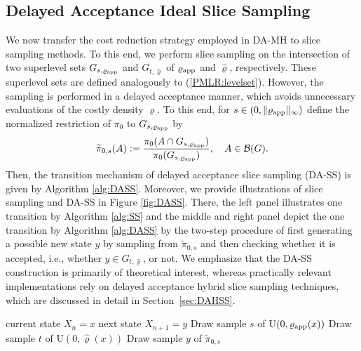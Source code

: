 \documentclass[sn-mathphys-num]{sn-jnl}%
\theoremstyle{thmstyleone}%
\theoremstyle{thmstyletwo}%
\theoremstyle{thmstylethree}%
\newcommand{\rhoapp}{\varrho_{{\rm app}}}
\newcommand{\change}[1]{\bgroup\color{black}#1\egroup}    %
\begin{document}
\subsection{Delayed Acceptance Ideal Slice Sampling}\label{sec:DAISS}
We now transfer the cost reduction strategy employed in DA-MH to slice sampling methods.
To this end, we perform slice sampling on the intersection of two superlevel sets $G_{s,\rhoapp}$ and $G_{t,\widehat{\varrho}}$ of $\rhoapp$ and $\widehat{\varrho}$, respectively.
These superlevel sets are defined analogously to (\ref{PMLR:levelset}). 
However, the sampling is performed in a delayed acceptance manner, which avoids unnecessary evaluations of the costly density $\varrho$.
To this end, for $s \in (0, \|\rhoapp\|_\infty)$ define the normalized restriction of $\pi_0$ to $G_{s,\rhoapp}$ by
\begin{align*}
	\widetilde{\pi}_{0,s}(A):=\frac{\pi_0(A \cap G_{s,\rhoapp})}{\pi_0(G_{s,\rhoapp})}, \quad A\in\mathcal{B}(G).
\end{align*} 
Then, the transition mechanism of delayed acceptance slice sampling (DA-SS) is given by Algorithm \ref{alg:DASS}. 
Moreover, we provide illustrations of slice sampling and DA-SS in Figure \ref{fig:DASS}.
There, the left panel illustrates one transition by Algorithm \ref{alg:SS} and the middle and right panel depict the one transition by Algorithm \ref{alg:DASS} by the two-step procedure of first generating a possible new state $y$ by sampling from $\widetilde{\pi}_{0,s}$ and then checking whether it is accepted, i.e., whether $y \in G_{t,\widehat{\varrho}}$, or not. \change{We emphasize that the DA-SS construction is primarily of theoretical interest, whereas practically relevant implementations rely on delayed acceptance hybrid slice sampling techniques, which are discussed in detail in Section~\ref{sec:DAHSS}.}

\begin{algorithm}
	\caption{Delayed Acceptance Ideal Slice Sampling}\label{alg:DASS}
	\renewcommand{\algorithmicrequire}{\textbf{Input:}}
	\renewcommand{\algorithmicensure}{\textbf{Output:}}
	\begin{algorithmic}[1]
		\Require current state $X_n = x$
		\Ensure next state $X_{n+1} = y$
     	\State Draw sample $s$ of $\mathrm{U}(0,\rhoapp(x))$
		\State Draw sample $t$ of $\mathrm{U}(0,\widehat{\varrho}(x))$
        \Repeat
		\State Draw sample $y$ of $\widetilde{\pi}_{0,s}$
	\end{algorithmic}
\end{algorithm}
\end{document}

